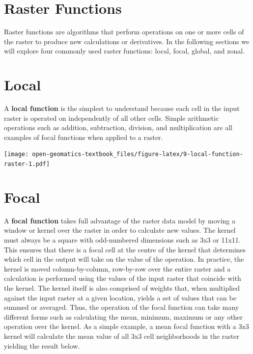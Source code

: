 \documentclass[
]{book}
\begin{document}
\hypertarget{raster-functions}{%
\section{Raster Functions}\label{raster-functions}}

Raster functions are algorithms that perform operations on one or more cells of the raster to produce new calculations or derivatives. In the following sections we will explore four commonly used raster functions: local, focal, global, and zonal.

\hypertarget{local}{%
\section{Local}\label{local}}

A \textbf{local function} is the simplest to understand because each cell in the input raster is operated on independently of all other cells. Simple arithmetic operations such as addition, subtraction, division, and multiplication are all examples of focal functions when applied to a raster.

\texttt{[image: open-geomatics-textbook\_files/figure-latex/9-local-function-raster-1.pdf]}

\hypertarget{focal}{%
\section{Focal}\label{focal}}

A \textbf{focal function} takes full advantage of the raster data model by moving a window or kernel over the raster in order to calculate new values. The kernel must always be a square with odd-numbered dimensions such as 3x3 or 11x11. This ensures that there is a focal cell at the centre of the kernel that determines which cell in the output will take on the value of the operation. In practice, the kernel is moved column-by-column, row-by-row over the entire raster and a calculation is performed using the values of the input raster that coincide with the kernel. The kernel itself is also comprised of weights that, when multiplied against the input raster at a given location, yields a set of values that can be summed or averaged. Thus, the operation of the focal function can take many different forms such as calculating the mean, minimum, maximum or any other operation over the kernel. As a simple example, a mean focal function with a 3x3 kernel will calculate the mean value of all 3x3 cell neighborhoods in the raster yielding the result below.
\end{document}
